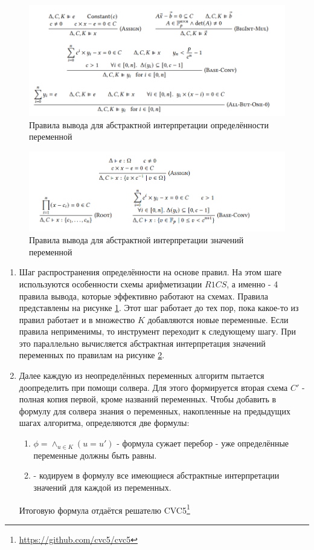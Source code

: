 \documentclass[a4paper]{article}
\begin{document}
\begin{figure}[ht!]
    \includegraphics[width=180mm]{QED_rules.png}
    \caption{Правила вывода для абстрактной интерпретации определённости переменной}
    \label{QED_rules}
\end{figure}

\begin{figure}[ht!]
    \includegraphics[width=180mm]{QED_values.png}
    \caption{Правила вывода для абстрактной интерпретации значений переменной}
    \label{QED_values}
\end{figure}

\begin{enumerate}
    \item Шаг распространения определённости на основе правил. На этом шаге используются особенности схемы арифметизации $R1CS$, а именно - 4 правила вывода, которые эффективно работают на схемах. Правила представлены на рисунке \ref{QED_rules}. Этот шаг работает до тех пор, пока какое-то из правил работает и в множество $K$ добавляются новые переменные. Если правила неприменимы, то инструмент переходит к следующему шагу. При это параллельно вычисляется абстрактная интерпретация значений переменных по правилам на рисунке \ref{QED_values}.
    \item Далее каждую из неопределённых переменных алгоритм пытается доопределить при помощи солвера. Для этого формируется вторая схема $C'$ - полная копия первой, кроме названий переменных. Чтобы добавить в формулу для солвера знания о переменных, накопленные на предыдущих шагах алгоритма, определяются две формулы:
    \begin{enumerate}
        \item $\phi = \land_{u \in K} (u = u')$ - формула сужает перебор - уже определённые переменные должны быть равны.
        \item - кодируем в формулу все имеющиеся абстрактные интерпретации значений для каждой из переменных.
    \end{enumerate}
    Итоговую формула отдаётся решателю CVC5\footnote[1]{\href{https://github.com/cvc5/cvc5}{https://github.com/cvc5/cvc5}}
\end{enumerate}
\end{document}
